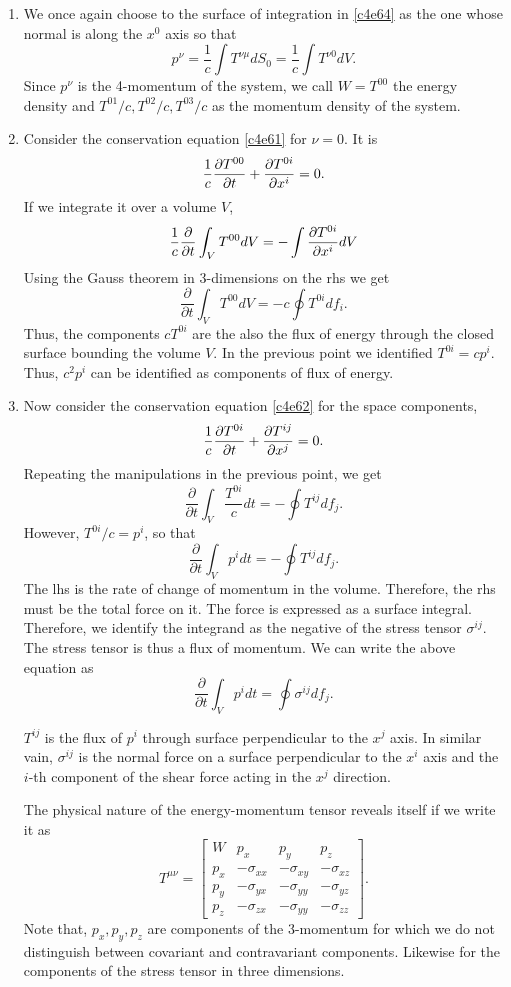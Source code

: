 \begin{enumerate}
\item We once again choose to the surface of integration in \eqref{c4e64} as the
one whose normal is along the $x^0$ axis so that
\[
p^\nu = \frac{1}{c}\int T^{\nu\mu}dS_0 = \frac{1}{c}\int T^{\nu 0}dV.
\]
Since $p^\nu$ is the 4-momentum of the system, we call $W = T^{00}$ the energy
density and $T^{01}/c, T^{02}/c, T^{03}/c$ as the momentum density of the 
system.

\item Consider the conservation equation \eqref{c4e61} for $\nu = 0$. It is
\[
\frac{1}{c}\frac{\partial{T^{00}}}{\partial{t}} + \frac{\partial{T^{0i}}}{\partial{x^i}} = 0.
\]
If we integrate it over a volume $V$, 
\[
\frac{1}{c}\frac{\partial}{\partial t}\int_V T^{00}dV = -\int\frac{\partial{T^{0i}}}{\partial{x^i}}dV
\]
Using the Gauss theorem in 3-dimensions on the rhs we get
\[
\frac{\partial}{\partial t}\int_V T^{00}dV = -c\oint T^{0i}df_i.
\]
Thus, the components $cT^{0i}$ are the also the flux of energy through the 
closed surface bounding the volume $V$. In the previous point we identified 
$T^{0i} = cp^i$. Thus, $c^2p^i$ can be identified as components of flux of 
energy.

\item Now consider the conservation equation \eqref{c4e62} for the space
components,
\[
\frac{1}{c}\frac{\partial{T^{0i}}}{\partial{t}} + \frac{\partial{T^{ij}}}{\partial{x^j}} = 0.
\]
Repeating the manipulations in the previous point, we get
\[
\frac{\partial}{\partial t}\int_V \frac{T^{0i}}{c} dt = -\oint T^{ij}df_j.
\]
However, $T^{0i}/c = p^i$, so that
\[
\frac{\partial}{\partial t}\int_V p^i dt = -\oint T^{ij}df_j.
\]
The lhs is the rate of change of momentum in the volume. Therefore, the rhs must
be the total force on it. The force is expressed as a surface integral. 
Therefore, we identify the integrand as the negative of the stress tensor 
$\sigma^{ij}$. The stress tensor is thus a flux of momentum. We can write the 
above equation as
\begin{equation}\label{c4e74}
\frac{\partial}{\partial t}\int_V p^i dt = \oint \sigma^{ij}df_j.
\end{equation}

$T^{ij}$ is the flux of $p^i$ through surface perpendicular to the $x^j$ axis. 
In similar vain, $\sigma^{ij}$ is the normal force on a surface perpendicular to
the $x^i$ axis and the $i$-th component of the shear force acting in the $x^j$ 
direction.

The physical nature of the energy-momentum tensor reveals itself if we write 
it as
\begin{equation}\label{c4e75}
T^{\mu\nu} = \begin{bmatrix}
W & p_x & p_y & p_z \\
p_x & -\sigma_{xx} & -\sigma_{xy} & -\sigma_{xz} \\
p_y & -\sigma_{yx} & -\sigma_{yy} & -\sigma_{yz} \\
p_z & -\sigma_{zx} & -\sigma_{yy} & -\sigma_{zz}
\end{bmatrix}.
\end{equation}
Note that, $p_x, p_y, p_z$ are components of the 3-momentum for which we do not
distinguish between covariant and contravariant components. Likewise for the
components of the stress tensor in three dimensions.


\end{enumerate}
